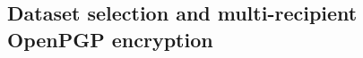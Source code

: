 \documentclass[]{interact}
\begin{document}




\FloatBarrier
\subsection{Dataset selection and multi-recipient OpenPGP encryption}
\label{sec:encryption}
\end{document}

